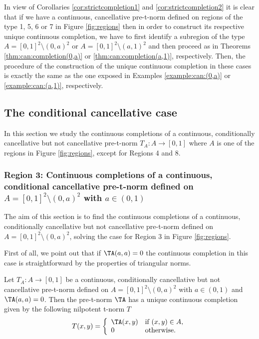 \begin{remark}
	In view of Corollaries \ref{cor:strictcompletion1} and \ref{cor:strictcompletion2} it is clear that if we have a continuous, cancellative pre-t-norm defined on regions of the type 1, 5, 6 or 7 in Figure \ref{fig:regions} then in order to construct its respective unique continuous completion, we have to first identify a subregion of the type $A=[0,1]^2 \setminus (0,a)^2$ or $A=[0,1]^2 \setminus (a,1)^2$ and then proceed as in Theorems \ref{thm:can:completion(0,a)} or \ref{thm:can:completion(a,1)}, respectively. Then, the procedure of the construction of the unique continuous completion in these cases is exactly the same as the one exposed in Examples \ref{example:can:(0,a)} or \ref{example:can:(a,1)}, respectively.
\end{remark}

\subsection{The conditional cancellative case}\label{subsection:completions_conditionalcase}

In this section we study the continuous completions of  a continuous, conditionally cancellative but not cancellative pre-t-norm $T_A:A \to [0,1]$ where $A$ is one of the regions in Figure \ref{fig:regions}, except for Regions 4 and 8.

\subsubsection{Region 3: Continuous completions of a continuous, conditional cancellative pre-t-norm defined on $A=[0,1]^2 \setminus (0,a)^2$ with $a \in (0,1)$}\label{subsubsection:cc:completions(0,a)}

The aim of this section is to find the continuous completions of a continuous, conditionally cancellative but not cancellative pre-t-norm defined on $A=[0,1]^2 \setminus (0,a)^2$, solving the case for Region 3 in Figure \ref{fig:regions}.

First of all, we point out that if $\TA(a,a)=0$ the continuous completion in this case is straightforward by the properties of triangular norms.
\begin{proposition}\label{prop:CompletionCase(0,a)TA(a,a)=0}
	Let $T_A: A \to [0,1]$ be a continuous, conditionally cancellative but not cancellative pre-t-norm defined on $A=[0,1]^2 \setminus (0,a)^2$ with $a \in (0,1)$ and $\TA(a,a)=0$. Then the pre-t-norm $\TA$ has a unique continuous completion given by the following nilpotent t-norm $T$
	\begin{equation}\label{eq:trivialCompletion}
		T(x,y)
		=
		\left\{ \begin{array}{ll}
			\TA(x,y) & \text{if } (x,y) \in A, \\
			0 & \text{otherwise.}
		\end{array}\right.
	\end{equation}
\end{proposition}

